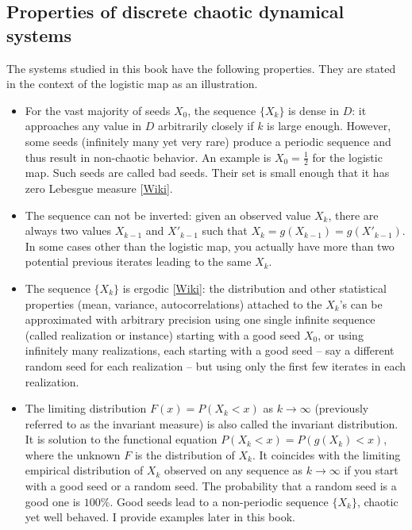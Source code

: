 \documentclass[oneside,10pt]{book}
\begin{document}
\subsection{Properties of discrete chaotic dynamical systems}\label{thorium}
The systems studied in this book have the following properties. They are stated in the context of the logistic map as an illustration. \vspace{1ex}
\begin{itemize}
\item For the vast majority of seeds $X_0$, 
 the sequence $\{X_k\}$ is dense in $D$: it approaches any value in $D$ arbitrarily closely if $k$ is large enough. 
However, some seeds (infinitely many yet very rare) produce a periodic sequence and thus result in non-chaotic behavior. An example is 
 $X_0=\frac{1}{2}$ for the logistic map. Such seeds are called \textcolor{index}{bad seeds}. Their set is small enough that it has zero \textcolor{index}{Lebesgue measure} [\href{https://en.wikipedia.org/wiki/Lebesgue_measure}{Wiki}].
\item The sequence can not be inverted: given an observed value $X_k$, there are always two values $X_{k-1}$ and $X'_{k-1}$ such
 that $X_k=g(X_{k-1}) = g(X'_{k-1})$. In some cases other than the logistic map, you actually have more than two potential previous iterates leading to the same $X_k$.
\item The sequence $\{X_k\}$ is \textcolor{index}{ergodic} [\href{https://en.wikipedia.org/wiki/Ergodicity}{Wiki}]: 
 the distribution and other statistical properties (mean, variance, autocorrelations) attached to the $X_k$'s can be approximated with arbitrary precision  using one single infinite sequence (called realization or instance) starting with a good seed $X_0$, or using infinitely many realizations, each starting with a good seed -- say a different random seed for each realization -- but using only the first few iterates in each realization.
\item The limiting distribution $F(x)=P(X_k<x)$ as $k\rightarrow\infty$ (previously referred to as the invariant measure) is  also called
 the \textcolor{index}{invariant distribution}. It is  solution to the functional 
 equation $P(X_k<x) = P(g(X_k)<x)$, where the unknown $F$ is the distribution of $X_k$. It coincides 
with the limiting \textcolor{index}{empirical distribution} of $X_k$ observed on any sequence as
 $k\rightarrow\infty$ if you start with a \textcolor{index}{good seed} or a random seed. The probability that a random seed is a good one is $100\%$. Good seeds lead to a non-periodic sequence $\{X_k\}$, chaotic yet well behaved. I provide examples later in this book.

\end{itemize}
\end{document}
